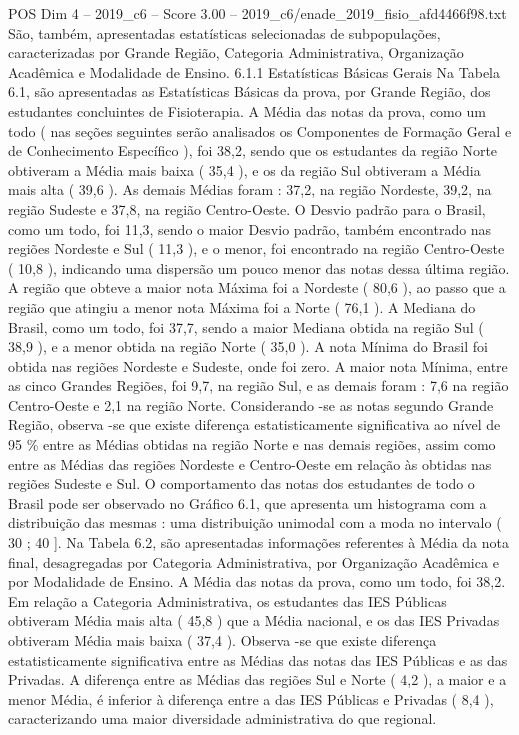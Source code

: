 \begin{textsample}{POS Dim 4 – 2019\_c6 – Score 3.00 – 2019\_c6/enade\_2019\_fisio\_afd4466f98.txt}
São, também, apresentadas estatísticas selecionadas de subpopulações, caracterizadas por Grande Região, Categoria Administrativa, Organização Acadêmica e Modalidade de Ensino. 6.1.1 Estatísticas Básicas Gerais Na Tabela 6.1, são apresentadas as Estatísticas Básicas da prova, por Grande Região, dos estudantes concluintes de Fisioterapia.
A Média das notas da prova, como um todo ( nas seções seguintes serão analisados os Componentes de Formação Geral e de Conhecimento Específico ), foi 38,2, sendo que os estudantes da região Norte obtiveram a Média mais baixa ( 35,4 ), e os da região Sul obtiveram a Média mais alta ( 39,6 ).
As demais Médias foram : 37,2, na região Nordeste, 39,2, na região Sudeste e 37,8, na região Centro-Oeste.
O Desvio padrão para o Brasil, como um todo, foi 11,3, sendo o maior Desvio padrão, também encontrado nas regiões Nordeste e Sul ( 11,3 ), e o menor, foi encontrado na região Centro-Oeste ( 10,8 ), indicando uma dispersão um pouco menor das notas dessa última região.
A região que obteve a maior nota Máxima foi a Nordeste ( 80,6 ), ao passo que a região que atingiu a menor nota Máxima foi a Norte ( 76,1 ).
A Mediana do Brasil, como um todo, foi 37,7, sendo a maior Mediana obtida na região Sul ( 38,9 ), e a menor obtida na região Norte ( 35,0 ).
A nota Mínima do Brasil foi obtida nas regiões Nordeste e Sudeste, onde foi zero.
A maior nota Mínima, entre as cinco Grandes Regiões, foi 9,7, na região Sul, e as demais foram : 7,6 na região Centro-Oeste e 2,1 na região Norte.
Considerando -se as notas segundo Grande Região, observa -se que existe diferença estatisticamente significativa ao nível de 95 \% entre as Médias obtidas na região Norte e nas demais regiões, assim como entre as Médias das regiões Nordeste e Centro-Oeste em relação às obtidas nas regiões Sudeste e Sul.
O comportamento das notas dos estudantes de todo o Brasil pode ser observado no Gráfico 6.1, que apresenta um histograma com a distribuição das mesmas : uma distribuição unimodal com a moda no intervalo ( 30 ; 40 ].
Na Tabela 6.2, são apresentadas informações referentes à Média da nota final, desagregadas por Categoria Administrativa, por Organização Acadêmica e por Modalidade de Ensino.
A Média das notas da prova, como um todo, foi 38,2.
Em relação a Categoria Administrativa, os estudantes das IES Públicas obtiveram Média mais alta ( 45,8 ) que a Média nacional, e os das IES Privadas obtiveram Média mais baixa ( 37,4 ).
Observa -se que existe diferença estatisticamente significativa entre as Médias das notas das IES Públicas e as das Privadas.
A diferença entre as Médias das regiões Sul e Norte ( 4,2 ), a maior e a menor Média, é inferior à diferença entre a das IES Públicas e Privadas ( 8,4 ), caracterizando uma maior diversidade administrativa do que regional.

\end{textsample}
